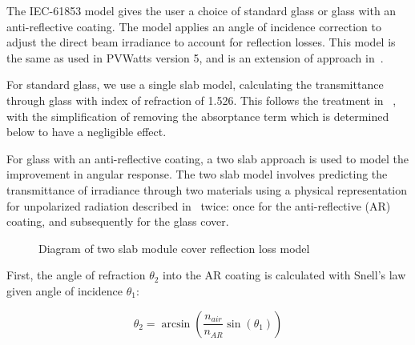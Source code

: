 \documentclass[12pt,letterpaper]{article}
\begin{document}
The IEC-61853 model gives the user a choice of standard glass or glass with an anti-reflective coating.  The model applies an angle of incidence correction to adjust the direct beam irradiance to account for reflection losses.  This model is the same as used in PVWatts version 5, and is an extension of approach in~\cite{desoto2004a}.

For standard glass, we use a single slab model, calculating the transmittance through glass with index of refraction of 1.526.  This follows the treatment in ~\cite{desoto2004a}, with the simplification of removing the absorptance term which is determined below to have a negligible effect.

For glass with an anti-reflective coating, a two slab approach is used to model the improvement in angular response.  The two slab model involves predicting the transmittance of irradiance through two materials using a physical representation for unpolarized radiation described in~\cite{desoto2004a} twice: once for the anti-reflective (AR) coating, and subsequently for the glass cover.
        
\begin{figure}[h!]
\begin{center}
\end{center}
\caption{Diagram of two slab module cover reflection loss model}
\label{fig_twoslab_model}
\end{figure}

First, the angle of refraction $\theta_2$ into the AR coating is calculated with Snell's law given angle of incidence $\theta_1$:

\begin{equation}\label{snell1}
\theta_2 = \arcsin\left( \frac{n_{air}}{n_{AR}} \sin(\theta_1 ) \right)
\end{equation}
\end{document}
